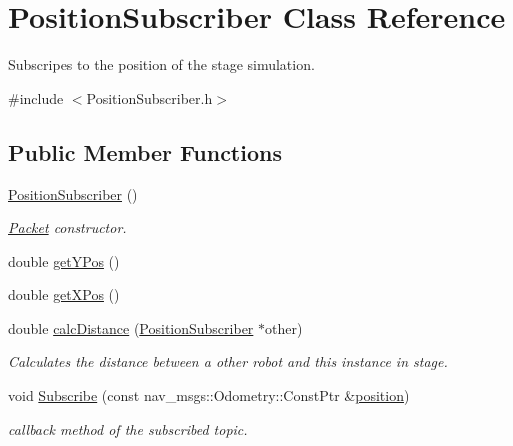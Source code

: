 \hypertarget{classPositionSubscriber}{\section{Position\-Subscriber Class Reference}
\label{classPositionSubscriber}
}


Subscripes to the position of the stage simulation.  




{\ttfamily \#include $<$Position\-Subscriber.\-h$>$}

\subsection*{Public Member Functions}
\begin{DoxyCompactItemize}
\item 
\hyperlink{classPositionSubscriber_acf731b94616fdc07d628d1a3da1c6e32}{Position\-Subscriber} ()
\begin{DoxyCompactList}\small\item\em \hyperlink{classPacket}{Packet} constructor. \end{DoxyCompactList}\item 
double \hyperlink{classPositionSubscriber_ad73f603c8e788b80f118621508371c79}{get\-Y\-Pos} ()
\item 
double \hyperlink{classPositionSubscriber_a60befd06f8e484b908062bef88826f24}{get\-X\-Pos} ()
\item 
double \hyperlink{classPositionSubscriber_af5a5c86914ccb4142d311e6af6eaa984}{calc\-Distance} (\hyperlink{classPositionSubscriber}{Position\-Subscriber} $\ast$other)
\begin{DoxyCompactList}\small\item\em Calculates the distance between a other robot and this instance in stage. \end{DoxyCompactList}\item 
void \hyperlink{classPositionSubscriber_a33e393de2b4a646a75898d0b84758ff9}{Subscribe} (const nav\-\_\-msgs\-::\-Odometry\-::\-Const\-Ptr \&\hyperlink{classPositionSubscriber_a6294488a471fddf065020e42d0671a23}{position})
\begin{DoxyCompactList}\small\item\em callback method of the subscribed topic. \end{DoxyCompactList}\end{DoxyCompactItemize}
